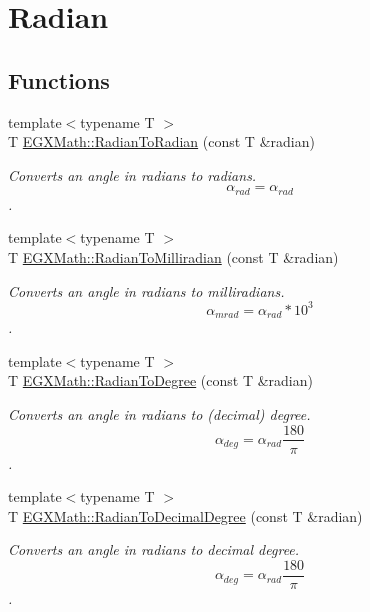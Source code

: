 \hypertarget{group___e_g_x_math-_angle_conversions-_radian}{}\section{Radian}
\label{group___e_g_x_math-_angle_conversions-_radian}
\subsection*{Functions}
\begin{DoxyCompactItemize}
\item 
{\footnotesize template$<$typename T $>$ }\\T \mbox{\hyperlink{group___e_g_x_math-_angle_conversions-_radian_gae08681bd86b8e7e4325f6c8cb3a0dc37}{E\+G\+X\+Math\+::\+Radian\+To\+Radian}} (const T \&radian)
\begin{DoxyCompactList}\small\item\em Converts an angle in radians to radians. \[\alpha_{rad}=\alpha_{rad}\]. \end{DoxyCompactList}\item 
{\footnotesize template$<$typename T $>$ }\\T \mbox{\hyperlink{group___e_g_x_math-_angle_conversions-_radian_gaea391f0cca39b05e298dd1cae162e7f1}{E\+G\+X\+Math\+::\+Radian\+To\+Milliradian}} (const T \&radian)
\begin{DoxyCompactList}\small\item\em Converts an angle in radians to milliradians. \[\alpha_{mrad}=\alpha_{rad}*10^3\]. \end{DoxyCompactList}\item 
{\footnotesize template$<$typename T $>$ }\\T \mbox{\hyperlink{group___e_g_x_math-_angle_conversions-_radian_ga25bbce6cdc1c3621f2a158d320e3bc45}{E\+G\+X\+Math\+::\+Radian\+To\+Degree}} (const T \&radian)
\begin{DoxyCompactList}\small\item\em Converts an angle in radians to (decimal) degree. \[\alpha_{deg}=\alpha_{rad}\frac{180}{\pi}\]. \end{DoxyCompactList}\item 
{\footnotesize template$<$typename T $>$ }\\T \mbox{\hyperlink{group___e_g_x_math-_angle_conversions-_radian_ga6d170f1882c32de53167c04524d05f67}{E\+G\+X\+Math\+::\+Radian\+To\+Decimal\+Degree}} (const T \&radian)
\begin{DoxyCompactList}\small\item\em Converts an angle in radians to decimal degree. \[\alpha_{deg}=\alpha_{rad}\frac{180}{\pi}\]. \end{DoxyCompactList}\item 

\end{DoxyCompactItemize}
